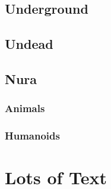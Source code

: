 \documentclass[a4paper,openany]{book}
\begin{document}
\begin{multicols}{2}

\bear

\boar

\chitincrawler

\basilisk

\end{multicols}

\section{Underground}

\begin{multicols}{2}

\umberhulk

\jelly

\jelly

\jelly

\jelly

\end{multicols}

\section{Undead}

\begin{multicols}{2}

\ghoul

\ghast

\demilich

\lich

\end{multicols}

\section{Nura}

\begin{multicols}{2}

\subsection{Animals}

\nurahorse

\nuracrab

\nuracat

\nuraslug

\nuraspider

\nurawolf

\subsection{Humanoids}

\goblin

\goblinnuramancer

\hobgoblin

\ogre

\end{multicols}


\chapter{Lots of Text}

\begin{multicols}{2}

\noindent
\lipsum


\end{multicols}
\end{document}

